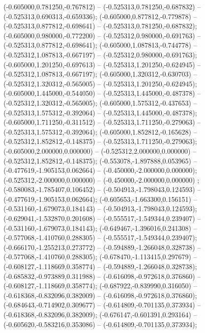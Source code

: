  (-0.605000,0.781250,-0.767812) -- (-0.525313,0.781250,-0.687832) -- (-0.525313,0.690313,-0.659336);
 (-0.605000,0.877812,-0.779878) -- (-0.525313,0.877812,-0.698641) -- (-0.525313,0.781250,-0.687832);
 (-0.605000,0.980000,-0.772200) -- (-0.525312,0.980000,-0.691763) -- (-0.525313,0.877812,-0.698641);
 (-0.605000,1.087813,-0.744778) -- (-0.525312,1.087813,-0.667197) -- (-0.525312,0.980000,-0.691763);
 (-0.605000,1.201250,-0.697613) -- (-0.525313,1.201250,-0.624945) -- (-0.525312,1.087813,-0.667197);
 (-0.605000,1.320312,-0.630703) -- (-0.525312,1.320312,-0.565005) -- (-0.525313,1.201250,-0.624945);
 (-0.605000,1.445000,-0.544050) -- (-0.525313,1.445000,-0.487378) -- (-0.525312,1.320312,-0.565005);
 (-0.605000,1.575312,-0.437653) -- (-0.525313,1.575312,-0.392064) -- (-0.525313,1.445000,-0.487378);
 (-0.605000,1.711250,-0.311512) -- (-0.525313,1.711250,-0.279063) -- (-0.525313,1.575312,-0.392064);
 (-0.605000,1.852812,-0.165628) -- (-0.525312,1.852812,-0.148375) -- (-0.525313,1.711250,-0.279063);
 (-0.605000,2.000000,0.000000) -- (-0.525312,2.000000,0.000000) -- (-0.525312,1.852812,-0.148375);
 (-0.553078,-1.897888,0.053965) -- (-0.477619,-1.905153,0.062664) -- (-0.450000,-2.000000,0.000000);
 (-0.525312,-2.000000,0.000000) -- (-0.450000,-2.000000,0.000000) ;
 (-0.580083,-1.785407,0.106452) -- (-0.504913,-1.798043,0.124593) -- (-0.477619,-1.905153,0.062664);
 (-0.605653,-1.663300,0.156151) -- (-0.531160,-1.679073,0.184143) -- (-0.504913,-1.798043,0.124593);
 (-0.629041,-1.532870,0.201608) -- (-0.555517,-1.549344,0.239407) -- (-0.531160,-1.679073,0.184143);
 (-0.649467,-1.396016,0.241308) -- (-0.577068,-1.410760,0.288305) -- (-0.555517,-1.549344,0.239407);
 (-0.666170,-1.255213,0.273772) -- (-0.594889,-1.266048,0.328738) -- (-0.577068,-1.410760,0.288305);
 (-0.678470,-1.113415,0.297679) -- (-0.608127,-1.118669,0.358774) -- (-0.594889,-1.266048,0.328738);
 (-0.685832,-0.973889,0.311988) -- (-0.616098,-0.972618,0.376860) -- (-0.608127,-1.118669,0.358774);
 (-0.687922,-0.839990,0.316050) -- (-0.618368,-0.832096,0.382009) -- (-0.616098,-0.972618,0.376860);
 (-0.684643,-0.714902,0.309677) -- (-0.614809,-0.701135,0.373934) -- (-0.618368,-0.832096,0.382009);
 (-0.676147,-0.601391,0.293164) -- (-0.605620,-0.583216,0.353086) -- (-0.614809,-0.701135,0.373934);
